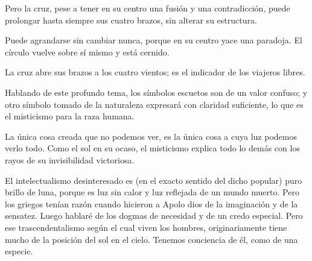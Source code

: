 Pero la cruz, pese a tener en su centro una fusión y una contradicción, puede prolongar hasta siempre sus
cuatro brazos, sin alterar su estructura.

Puede agrandarse sin cambiar nunca, porque en su centro yace una paradoja. El círculo vuelve sobre
sí mismo y está cernido.

La cruz abre sus brazos a los cuatro vientos; es el indicador de los viajeros libres.

Hablando de este profundo tema, los símbolos escuetos son de un valor confuso; y otro símbolo
tomado de la naturaleza expresará con claridad suficiente, lo que es el misticismo para la raza humana.

La única cosa creada que no podemos ver, es la única cosa a cuya luz podemos verlo todo. Como el
sol en su ocaso, el misticismo explica todo lo demás con los rayos de su invisibilidad victoriosa.

El intelectualismo desinteresado es (en el exacto sentido del dicho popular) puro brillo de luna,
porque es luz sin calor y luz reflejada de un mundo muerto. Pero los griegos tenían razón cuando hicieron
a Apolo dios de la imaginación y de la sensatez. Luego hablaré de los dogmas de necesidad y de un credo
especial. Pero ese trascendentalismo según el cual viven los hombres, originariamente tiene mucho de la
posición del sol en el cielo. Tenemos conciencia de él, como de una especie.
\finalCapituloOrnamento
